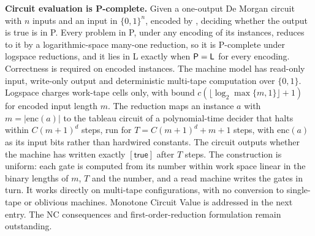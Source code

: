 \begin{result}
\end{result}


\begin{result}
\textbf{Circuit evaluation is P-complete.}
Given a one-output De Morgan circuit with $n$ inputs and an input in
$\{0,1\}^n$, encoded by , deciding whether the output is
true is in P. Every problem in P, under any encoding of its instances, reduces to
it by a logarithmic-space many-one reduction, so it is P-complete under logspace
reductions, and it lies in L exactly when $\mathsf{P}=\mathsf{L}$ for every encoding.
Correctness is required on encoded instances. The machine model has read-only input,
write-only output and deterministic multi-tape computation over $\{0,1\}$.
Logspace charges work-tape cells only, with bound
$c(\lfloor\log_2\max\{m,1\}\rfloor+1)$ for encoded input length $m$.
The reduction maps an instance $a$ with $m=|\mathrm{enc}(a)|$ to the tableau
circuit of a polynomial-time decider that halts within $C(m+1)^d$ steps,
run for $T=C(m+1)^d+m+1$ steps, with $\mathrm{enc}(a)$ as its input bits
rather than hardwired constants. The circuit outputs whether the machine
has written exactly $[\mathsf{true}]$ after $T$ steps. The construction is uniform:
each gate is computed from its number within work space linear in the binary
lengths of $m$, $T$ and the number, and a read machine writes the gates in turn. It
works directly on multi-tape configurations, with no conversion to single-tape or
oblivious machines. Monotone Circuit Value is addressed in the next entry. The NC
consequences and first-order-reduction formulation remain outstanding.
\citep{Ladner1975,AroraBarak09,Papadimitriou94}

\end{result}
